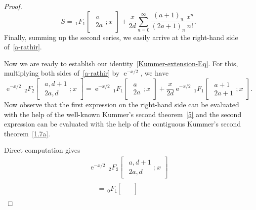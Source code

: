 \documentclass[reqno]{amsart}
\numberwithin{equation}{section}
\theoremstyle{plain}
\theoremstyle{remark}
\DeclareMathOperator{\te}{e}
\begin{document}
\begin{proof}
\begin{equation*}
S={\,}_1F_1\begin{bmatrix}
\begin{gathered}
a\\2a
\end{gathered};x
\end{bmatrix}
+\frac{x}{2d}\sum_{n=0}^{\infty}\frac{(a+1)_n}{(2a+1)_n}\frac{x^n}{n!}.
\end{equation*}
Finally, summing up the second series, we easily arrive at the right-hand side of~\eqref{a-rathir}.
\par
Now we are ready to establish our identity~\eqref{Kummer-extension-Eq}. For this, multiplying both sides of~\eqref{a-rathir} by $\te^{-x/2}$, we have
\begin{equation*}
\te^{-x/2}{\,}_2F_2\begin{bmatrix}
\begin{gathered}
a,d+1\\2a,d
\end{gathered};x
\end{bmatrix}=\te^{-x/2}{\,}_1F_1\begin{bmatrix}
\begin{gathered}
a\\ 2a
\end{gathered}; x
\end{bmatrix}
+\frac{x}{2d}\te^{-x/2}{\,}_1F_1\begin{bmatrix}\begin{gathered}
a+1\\2a+1
\end{gathered};x\end{bmatrix}.
\end{equation*}
Now observe that the first expression on the right-hand side can be evaluated with the help of the well-known Kummer's second theorem~\eqref{5} and the second expression can be evaluated with the help of the contiguous Kummer's second theorem~\eqref{1.7a}.
\par
Direct computation gives
\begin{multline}\label{4-rathie}
\te^{-x/2}{\,}_2F_2\begin{bmatrix}
\begin{gathered}
a,d+1\\2a,d
\end{gathered}; x
\end{bmatrix}\\
\begin{aligned}
&={\,}_0F_1\begin{bmatrix}
\begin{gathered}

\end{gathered}
\end{bmatrix}
\end{aligned}
\end{multline}
\end{proof}
\end{document}

